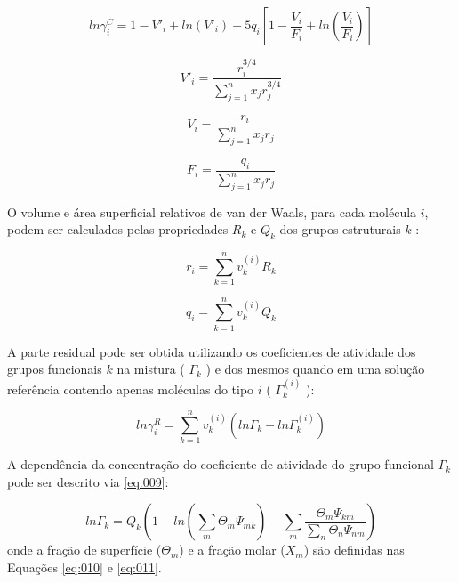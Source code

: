 \begin{equation}\label{eq:002}
ln\gamma_i^C = 1 - V'_i + ln(V'_i) - 5q_i\left [ 1
- \frac{V_i}{F_i} + ln\left ( \frac{V_i}{F_i} \right ) \right ]
\end{equation}

\begin{equation}\label{eq:003}
V'_i = \frac{r_i^{3/4}}{\displaystyle\sum_{j=1}^nx_jr_j^{3/4}}
\end{equation}

\begin{equation}\label{eq:004}
V_i = \frac{r_i}{\displaystyle\sum_{j=1}^nx_jr_j}
\end{equation}

\begin{equation}\label{eq:005}
F_i = \frac{q_i}{\displaystyle\sum_{j=1}^nx_jr_j}
\end{equation}

O volume e área superficial relativos de van der Waals, para cada molécula $i$,
podem ser calculados pelas propriedades $R_k$  e $Q_k$  dos grupos estruturais
$k$ :

\begin{equation}\label{eq:006}
r_i = \displaystyle\sum_{k=1}^nv_k^{(i)}R_k
\end{equation}

\begin{equation}\label{eq:007}
q_i = \displaystyle\sum_{k=1}^nv_k^{(i)}Q_k
\end{equation}

A parte residual pode ser obtida utilizando os coeficientes de atividade dos
grupos funcionais $k$  na mistura ( $\Gamma_k$ ) e dos mesmos quando em uma
solução referência contendo apenas moléculas do tipo $i$ ( $\Gamma_k^{(i)}$ ):


\begin{equation}\label{eq:008}
ln\gamma_i^R = \displaystyle\sum_{k=1}^nv^{(i)}_k\left ( ln\Gamma_k -
ln\Gamma_k^{(i)} \right )
\end{equation}

A dependência da concentração do coeficiente de atividade do grupo funcional
$\Gamma_k$ pode ser descrito via \autoref{eq:009}:

\begin{equation}\label{eq:009}
ln\Gamma_k = Q_k\left ( 1 - ln\left ( \displaystyle\sum_m\Theta_m\Psi_{mk}
\right ) -
\displaystyle\sum_m\frac{\Theta_m\Psi_{km}}{\displaystyle\sum_n\Theta_n\Psi_{nm}}
\right )
\end{equation}
onde a fração de superfície ($\Theta_m$) e a fração molar ($X_m$) são definidas
nas Equações \ref{eq:010} e \ref{eq:011}.

